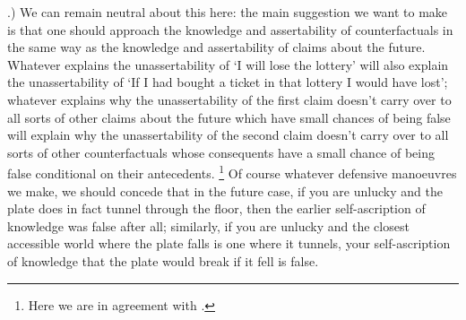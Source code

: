 \documentclass[If.tex]{subfiles}
\begin{document}
\cite{HawthorneKL}.)
We can remain neutral about this here: the main suggestion we want to make is that one should approach the knowledge and assertability of counterfactuals in the same way as the knowledge and assertability of claims about the future. Whatever explains the unassertability of ‘I will lose the lottery’ will also explain the unassertability of ‘If I had bought a ticket in that lottery I would have lost’; whatever explains why the unassertability of the first claim doesn't carry over to all sorts of other claims about the future which have small chances of being false will explain why the unassertability of the second claim doesn't carry over to all sorts of other counterfactuals whose consequents have a small chance of being false conditional on their antecedents.%
\footnote{Here we are in agreement with \citet{MossSCSH}.} 
Of course whatever defensive manoeuvres we make, we should concede that in the future case, if you are unlucky and the plate does in fact tunnel through the floor, then the earlier self-ascription of knowledge was false after all; similarly, if you are unlucky and the closest accessible world where the plate falls is one where it tunnels, your self-ascription of knowledge that the plate would break if it fell is false.%
\end{document}
